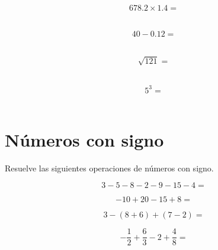 \documentclass[11pt]{article}
\begin{document}
\begin{multicols}{2}

\begin{equation} 678.2   \times  1.4 =\end{equation}\\
\vspace{2.5cm}

\begin{equation}    40 - 0.12    =\end{equation}\\
\vspace{2.5cm}

\begin{equation}    \sqrt{121} =\end{equation}\\
\vspace{2.5cm}

\begin{equation}    5^{3} =\end{equation}\\
\vspace{2.5cm}

\end{multicols}

\section{N\'umeros con signo}
Resuelve las siguientes operaciones de n\'umeros con signo.
\setcounter{equation}{0}

\begin{multicols}{2}

\begin{equation}    3 - 5 - 8 - 2 - 9 - 15 - 4 = \end{equation}
\vspace{2.5cm}

\begin{equation}    -10 + 20 -15 + 8 = \end{equation}
\vspace{2.5cm}

\begin{equation}    3 - (8+6) + (7-2) = \end{equation}
\vspace{2.5cm}

\begin{equation}    -\frac{1}{2} + \frac{6}{3} -2 + \frac{4}{8} = \end{equation}
\vspace{2.5cm}

\end{multicols}
\end{document}

